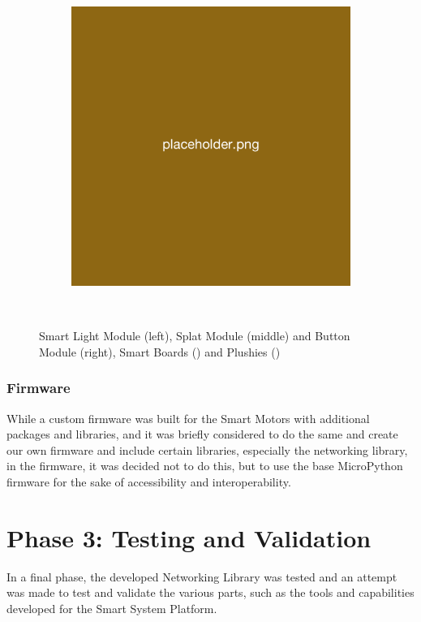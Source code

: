 \begin{figure}[H]
\begin{subfigure}[b]{0.25\textwidth}
    \end{subfigure}
    \hspace{10pt}
    \begin{subfigure}[b]{0.25\textwidth}
        \includegraphics[width=\linewidth]{overleaf/images/placeholder.png}
    \end{subfigure}
    \\\vspace{\ftspace}
    \caption{Smart Light Module (left), Splat Module (middle) and Button Module (right), Smart Boards () and Plushies () \citep{jess_smart_2025}}
    \label{fig:hardware_examples}
\end{figure}

\subsubsection{\label{sec:methods_fw}Firmware}
While a custom firmware was built for the Smart Motors with additional packages and libraries, and it was briefly considered to do the same and create our own firmware and include certain libraries, especially the networking library, in the firmware, it was decided not to do this, but to use the base MicroPython firmware for the sake of accessibility and interoperability.

\section{\label{sec:methods_ph3}Phase 3: Testing and Validation}
In a final phase, the developed Networking Library was tested and an attempt was made to test and validate the various parts, such as the tools and capabilities developed for the Smart System Platform.

